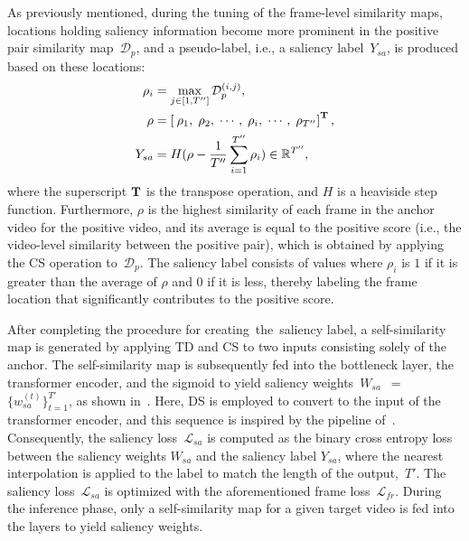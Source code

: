 \documentclass[10pt,twocolumn,letterpaper]{article}
\begin{document}
            As previously mentioned, during the tuning of the frame-level similarity maps, locations holding saliency information become more prominent in the positive pair similarity map~$\mathcal{D}_{p}$, and a pseudo-label, i.e., a saliency label~$Y_{sa}$, is produced based on these locations:
            {\small
                \begin{align}
                    \rho_{i} &= \max_{j\in [1,T^{\prime \prime }]} \mathcal{D}_{p}^{(i,j)}, \nonumber
                    \\
                    \rho &= \left [\: \rho_1, \; \rho_2, \; \cdots, \; \rho_{i}, \; \cdots, \; \rho_{T''} \right ]^{\textup{\textbf{T}}},
                    \nonumber
                    \\
                    Y_{sa} &= H ( \rho - \frac{1}{T^{\prime \prime }}\sum_{i=1}^{T^{\prime \prime }} \rho_i ) \in \mathbb{R}^{T^{\prime \prime }},
                \end{align}
            }\noindent where the superscript $\textup{\textbf{T}}$ is the transpose operation, and $H$ is a heaviside step function. Furthermore, $\rho$ is the highest similarity of each frame in the anchor video for the positive video, and its average is equal to the positive score (i.e., the video-level similarity between the positive pair), which is obtained by applying the CS operation to~$\mathcal{D}_{p}$. The saliency label consists of values where $\rho_{i}$ is $1$ if it is greater than the average of $\rho$ and $0$ if it is less, thereby labeling the frame location that significantly contributes to the positive score.

            After completing the procedure for creating the saliency label, a self-similarity map is generated by applying TD and CS to two inputs consisting solely of the anchor. The self-similarity map is subsequently fed into the bottleneck layer, the transformer encoder, and the sigmoid to yield saliency weights~$W_{sa}$~$=$~$\{ w^{(t)}_{sa} \}^{T'}_{t=1}$, as shown in~. Here, DS is employed to convert to the input of the transformer encoder, and this sequence is inspired by the pipeline of~\cite{kang2022uboco}. Consequently, the saliency loss~$\mathcal{L}_{sa}$ is computed as the binary cross entropy loss between the saliency weights $W_{sa}$ and the saliency label $Y_{sa}$, where the nearest interpolation is applied to the label to match the length of the output,~$T'$. The saliency loss~$\mathcal{L}_{sa}$ is optimized with the aforementioned frame loss~$\mathcal{L}_{fr}$. During the inference phase, only a self-similarity map for a given target video is fed into the layers to yield saliency weights.
            
\end{document}
